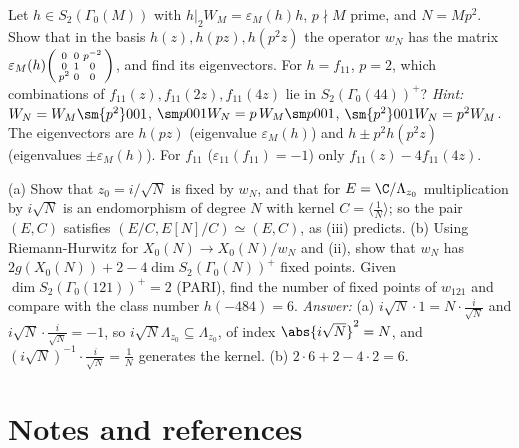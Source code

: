 \begin{exercise}\label{ex:modforms:ex-al-p2}
Let $h\in S_2(\Gamma_0(M))$ with $h|_2W_M=\varepsilon_M(h)h$, $p\nmid M$ prime, and $N=Mp^2$. Show that in the basis $h(z),h(pz),h(p^2z)$ the operator $w_N$ has the matrix
$\varepsilon_M(h)\begin{psmallmatrix}0&0&p^{-2}\\0&1&0\\p^2&0&0\end{psmallmatrix}$, and find its eigenvectors. For $h=f_{11}$, $p=2$, which combinations of $f_{11}(z),f_{11}(2z),f_{11}(4z)$ lie in
$S_2(\Gamma_0(44))^+$?
\emph{Hint:} $W_N=W_M\sm{p^2}001$, $\sm p001W_N=p\,W_M\sm p001$, $\sm{p^2}001W_N=p^2W_M$. The eigenvectors are $h(pz)$ (eigenvalue $\varepsilon_M(h)$) and $h\pm p^2h(p^2z)$ (eigenvalues $\pm\varepsilon_M(h)$).
For $f_{11}$ ($\varepsilon_{11}(f_{11})=-1$) only $f_{11}(z)-4f_{11}(4z)$.
\end{exercise}

\begin{exercise}\label{ex:modforms:ex-fixed-points}
(a) Show that $z_0=i/\sqrt N$ is fixed by $w_N$, and that for $E=\C/\Lambda_{z_0}$ multiplication by $i\sqrt N$ is an endomorphism of degree $N$ with kernel $C=\langle\frac1N\rangle$; so the pair
$(E,C)$ satisfies $(E/C,E[N]/C)\simeq(E,C)$, as (iii) predicts. (b) Using Riemann-Hurwitz for $X_0(N)\to X_0(N)/w_N$ and
(ii), show that $w_N$ has $2g(X_0(N))+2-4\dim S_2(\Gamma_0(N))^+$ fixed points. Given $\dim S_2(\Gamma_0(121))^+=2$ (PARI), find the number of fixed
points of $w_{121}$ and compare with the class number $h(-484)=6$.
\emph{Answer:} (a) $i\sqrt N\cdot1=N\cdot\frac i{\sqrt N}$ and $i\sqrt N\cdot\frac i{\sqrt N}=-1$, so $i\sqrt N\Lambda_{z_0}\subseteq\Lambda_{z_0}$, of index $\abs{i\sqrt N}^2=N$, and $(i\sqrt N)^{-1}\cdot\frac i{\sqrt N}=\frac1N$ generates the
kernel. (b) $2\cdot6+2-4\cdot2=6$.
\end{exercise}

\section{Notes and references}\label{sec:modforms:notes}

